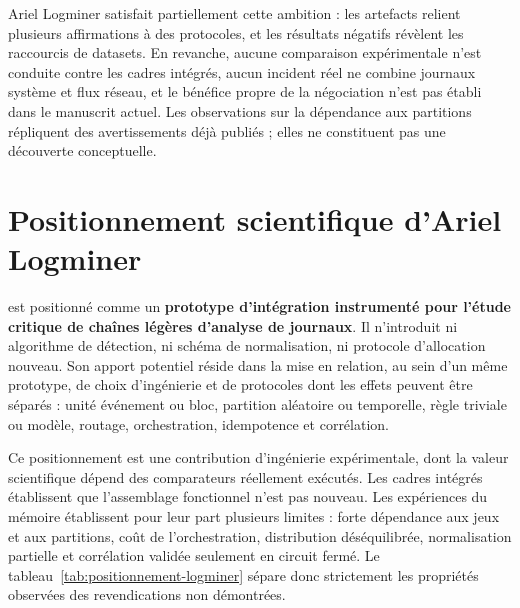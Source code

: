 Ariel Logminer satisfait partiellement cette ambition : les artefacts relient plusieurs
affirmations à des protocoles, et les résultats négatifs révèlent les raccourcis de
datasets. En revanche, aucune comparaison expérimentale n'est conduite contre les cadres
intégrés, aucun incident réel ne combine journaux système et flux réseau, et le bénéfice
propre de la négociation n'est pas établi dans le manuscrit actuel. Les observations sur
la dépendance aux partitions répliquent des avertissements déjà publiés
\cite{sommer2010outside,arp2022dos,le2022logbased,engelen2021troubleshooting,liu2022error} ;
elles ne constituent pas une découverte conceptuelle.

\section{Positionnement scientifique d'Ariel Logminer}

\logminer{} est positionné comme un \textbf{prototype d'intégration instrumenté pour
l'étude critique de chaînes légères d'analyse de journaux}. Il n'introduit ni algorithme
de détection, ni schéma de normalisation, ni protocole d'allocation nouveau. Son apport
potentiel réside dans la mise en relation, au sein d'un même prototype, de choix
d'ingénierie et de protocoles dont les effets peuvent être séparés : unité événement ou
bloc, partition aléatoire ou temporelle, règle triviale ou modèle, routage, orchestration,
idempotence et corrélation.

Ce positionnement est une contribution d'ingénierie expérimentale, dont la valeur
scientifique dépend des comparateurs réellement exécutés. Les cadres intégrés établissent
que l'assemblage fonctionnel n'est pas nouveau. Les expériences du mémoire établissent
pour leur part plusieurs limites : forte dépendance aux jeux et aux partitions, coût de
l'orchestration, distribution déséquilibrée, normalisation partielle et corrélation
validée seulement en circuit fermé. Le tableau~\ref{tab:positionnement-logminer} sépare
donc strictement les propriétés observées des revendications non démontrées.

